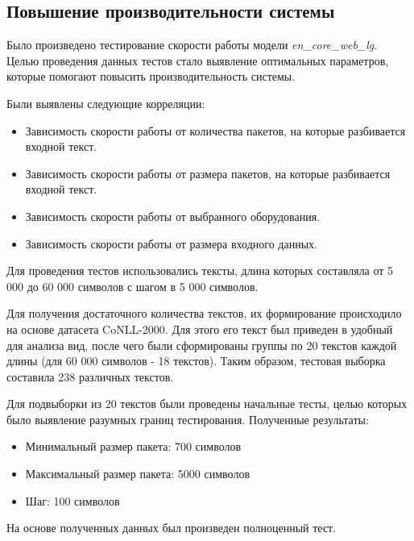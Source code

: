 \subsection{Повышение производительности системы}
Было произведено тестирование скорости работы модели \emph{en\_core\_web\_lg}. Целью проведения данных тестов стало выявление оптимальных параметров, которые помогают повысить производительность системы.

Были выявлены следующие корреляции:
\begin{itemize}
  \item Зависимость скорости работы от количества пакетов, на которые разбивается входной текст.
  \item Зависимость скорости работы от размера пакетов, на которые разбивается входной текст.
  \item Зависимость скорости работы от выбранного оборудования.
    \item Зависимость скорости работы от размера входного данных.
\end{itemize}

Для проведения тестов использовались тексты, длина которых составляла от 5 000 до 60 000 символов с шагом в 5 000 символов.

Для получения достаточного количества текстов, их формирование происходило на основе датасета CoNLL-2000. Для этого его текст был приведен в удобный для анализа вид, после чего были сформированы группы по 20 текстов каждой длины (для 60 000 символов - 18 текстов).
Таким образом, тестовая выборка составила 238 различных текстов.

Для подвыборки из 20 текстов были проведены начальные тесты, целью которых было выявление разумных границ тестирования.
Полученные  результаты:
\begin{itemize}
  \item Минимальный размер пакета: 700 символов
  \item Максимальный размер пакета: 5000 символов
  \item Шаг: 100 символов
\end{itemize}

На основе полученных данных был произведен полноценный тест. 

